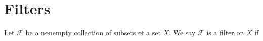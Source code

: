 \chapter{Filters}

\begin{definition}
    Let \(\mathscr{F}\) be a nonempty collection of subsets of a set \(X\). We say \(\mathscr{F}\) is a filter on \(X\) if
\end{definition}